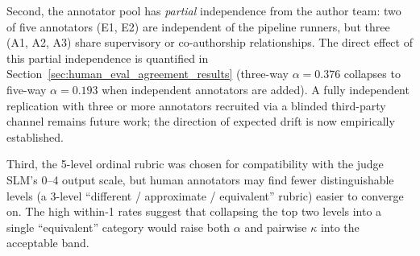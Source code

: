 Second, the annotator pool has \emph{partial} independence from the
author team: two of five annotators (E1, E2) are independent of the
pipeline runners, but three (A1, A2, A3) share supervisory or
co-authorship relationships. The direct effect of this partial
independence is quantified in Section~\ref{sec:human_eval_agreement_results}
(three-way $\alpha = 0.376$ collapses to five-way $\alpha = 0.193$ when
independent annotators are added). A fully independent replication with
three or more annotators recruited via a blinded third-party channel
remains future work; the direction of expected drift is now empirically
established.

Third, the 5-level ordinal rubric was chosen for compatibility with the
judge SLM's 0--4 output scale, but human annotators may find fewer
distinguishable levels (a 3-level ``different / approximate / equivalent''
rubric) easier to converge on. The high within-1 rates suggest that
collapsing the top two levels into a single ``equivalent'' category
would raise both $\alpha$ and pairwise $\kappa$ into the acceptable
band.


